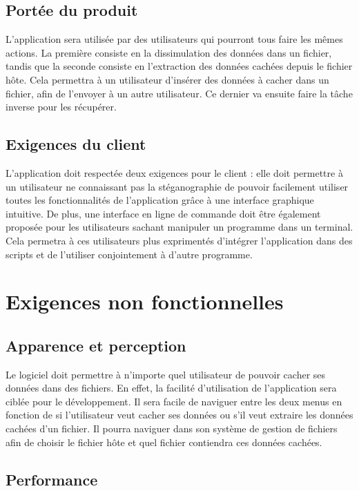 \documentclass[11pt]{article}
\begin{document}
\subsection{Portée du produit}

L'application sera utilisée par des utilisateurs qui pourront tous faire les
mêmes actions. La première consiste en la dissimulation des données dans un
fichier, tandis que la seconde consiste en l'extraction des données cachées
depuis le fichier hôte. Cela permettra à un utilisateur d'insérer des données à
cacher dans un fichier, afin de l'envoyer à un autre utilisateur. Ce dernier va
ensuite faire la tâche inverse pour les récupérer.

\subsection{Exigences du client}

L'application doit respectée deux exigences pour le client : elle doit permettre
à un utilisateur ne connaissant pas la stéganographie de pouvoir facilement
utiliser toutes les fonctionnalités de l'application grâce à une interface
graphique intuitive. De plus, une interface en ligne de commande doit être
également proposée pour les utilisateurs sachant manipuler un programme dans un
terminal. Cela permetra à ces utilisateurs plus exprimentés d'intégrer
l'application dans des scripts et de l'utiliser conjointement à d'autre
programme.

\section{Exigences non fonctionnelles}

\subsection{Apparence et perception}

Le logiciel doit permettre à n'importe quel utilisateur de pouvoir cacher ses
données dans des fichiers. En effet, la facilité d'utilisation de l'application
sera ciblée pour le développement. Il sera facile de naviguer entre les deux
menus en fonction de si l'utilisateur veut cacher ses données ou s'il veut
extraire les données cachées d'un fichier. Il pourra naviguer dans son système
de gestion de fichiers afin de choisir le fichier hôte et quel fichier
contiendra ces données cachées. 

\subsection{Performance}
\end{document}
